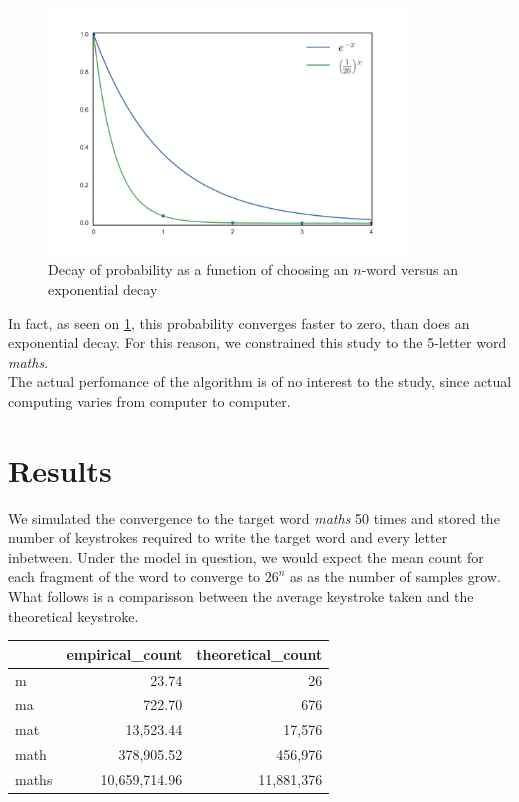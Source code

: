 \documentclass{article}
\begin{document}
\begin{figure}[h]
    \centering
    \includegraphics[width=0.85\textwidth]{decay}
    \caption{Decay of probability as a function of choosing an $n$-word versus an exponential decay}
    \label{fig:decay}
\end{figure}

In fact, as seen on \ref{fig:decay}, this probability converges faster to zero, than does an exponential decay. For this reason, we constrained this study to the 5-letter word \textit{maths}.\\


The actual perfomance of the algorithm is of no interest to the study, since actual computing varies from computer to computer.

\section{Results}
We simulated the convergence to the target word \textit{maths} 50 times and stored the number of keystrokes required to write the target word and every letter inbetween. Under the model in question, we would expect the mean count for each fragment of the word to converge to $26^n$ as as the number of samples grow. What follows is a comparisson between the average keystroke taken and the theoretical keystroke.

\begin{center}
\begin{tabular}{l|r|r}
\toprule
{} &  empirical\_count &  theoretical\_count \\
\midrule
\hline
m     &            23.74 &                 26 \\
ma    &           722.70 &                676 \\
mat   &         13,523.44 &              17,576 \\
math  &        378,905.52 &             456,976 \\
maths &      10,659,714.96 &           11,881,376 \\
\bottomrule
\end{tabular}
\end{center}
\end{document}
